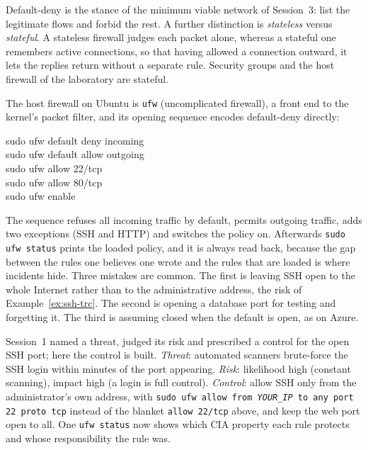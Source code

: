 Default-deny is the stance of the minimum viable network of Session~3: list
the legitimate flows and forbid the rest. A further distinction is
\emph{stateless} versus \emph{stateful}. A stateless firewall judges each
packet alone, whereas a stateful one remembers active connections, so that
having allowed a connection outward, it lets the replies return without a
separate rule. Security groups and the host firewall of the laboratory are
stateful.

The host firewall on Ubuntu is \texttt{ufw} (uncomplicated firewall), a front
end to the kernel's packet filter, and its opening sequence encodes
default-deny directly:
\begin{center}
\ttfamily
sudo ufw default deny incoming\\
sudo ufw default allow outgoing\\
sudo ufw allow 22/tcp\\
sudo ufw allow 80/tcp\\
sudo ufw enable
\end{center}
\noindent The sequence refuses all incoming traffic by default, permits
outgoing traffic, adds two exceptions (SSH and HTTP) and switches the policy
on. Afterwards \texttt{sudo ufw status} prints the loaded policy, and it is
always read back, because the gap between the rules one believes one wrote
and the rules that are loaded is where incidents hide. Three mistakes are
common. The first is leaving SSH open to the whole Internet rather than to
the administrative address, the risk of Example~\ref{ex:ssh-trc}. The second
is opening a database port for testing and forgetting it. The third is
assuming closed when the default is open, as on Azure.

\begin{example}\label{ex:ufw-trc}
Session~1 named a threat, judged its risk and prescribed a control for the
open SSH port; here the control is built. \emph{Threat}: automated scanners
brute-force the SSH login within minutes of the port appearing. \emph{Risk}:
likelihood high (constant scanning), impact high (a login is full control).
\emph{Control}: allow SSH only from the administrator's own address, with
\texttt{sudo ufw allow from \emph{YOUR\_IP} to any port 22 proto tcp} instead
of the blanket \texttt{allow 22/tcp} above, and keep the web port open to all.
One \texttt{ufw status} now shows which CIA property each rule protects and
whose responsibility the rule was.
\end{example}

